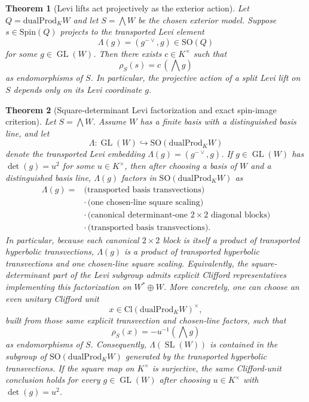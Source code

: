 \documentclass{birkjour}
\theoremstyle{plain}
\newtheorem{theorem}{Theorem}[section]
\theoremstyle{definition}
\theoremstyle{remark}
\newcommand{\Cl}{\mathrm{Cl}}
\newcommand{\Spin}{\mathrm{Spin}}
\newcommand{\SO}{\mathrm{SO}}
\newcommand{\dualProd}{\mathrm{dualProd}}
\begin{document}
\begin{theorem}[Levi lifts act projectively as the exterior action]
\label{thm:levi-projective-exterior}
Let $Q=\dualProd_K W$ and let $S=\bigwedge W$ be the chosen exterior model.
Suppose $s\in \Spin(Q)$ projects to the transported Levi element
\[
  \Lambda(g)=(g^{-{\vee}},g)\in \SO(Q)
\]
for some $g\in \operatorname{GL}(W)$. Then there exists $c\in K^\times$ such that
\[
  \rho_S(s)=c\,(\bigwedge g)
\]
as endomorphisms of $S$. In particular, the projective action of a split Levi
lift on $S$ depends only on its Levi coordinate $g$.
\end{theorem}

\begin{theorem}[Square-determinant Levi factorization and exact spin-image criterion]
\label{thm:square-det-levi}
Let $S=\bigwedge W$. Assume $W$ has a finite basis with a distinguished basis
line, and let
\[
  \Lambda:\operatorname{GL}(W)\hookrightarrow \SO(\dualProd_K W)
\]
denote the transported Levi embedding $\Lambda(g)=(g^{-{\vee}},g)$. If
$g\in \operatorname{GL}(W)$ has $\det(g)=u^2$ for some $u\in K^\times$, then
after choosing a basis of $W$ and a distinguished basis line, $\Lambda(g)$
factors in
$\SO(\dualProd_K W)$ as
\[
  \begin{aligned}
  \Lambda(g) ={}&
    \text{(transported basis transvections)} \\
    &\cdot\, \text{(one chosen-line square scaling)} \\
    &\cdot\, \text{(canonical determinant-one $2\times 2$ diagonal blocks)} \\
    &\cdot\, \text{(transported basis transvections)}.
  \end{aligned}
\]
In particular, because each canonical $2\times2$ block is itself a product of
transported hyperbolic transvections, $\Lambda(g)$ is a product of transported
hyperbolic transvections and one chosen-line square scaling. Equivalently, the
square-determinant part of the Levi subgroup admits explicit Clifford
representatives implementing this factorization on $W^*\oplus W$. More
concretely,
one can choose an even unitary Clifford unit
\[
  x\in \Cl(\dualProd_K W)^\times,
\]
built from those same explicit transvection and chosen-line factors, such that
\[
  \rho_S(x)=-u^{-1}(\bigwedge g)
\]
as endomorphisms of $S$. Consequently, $\Lambda(\operatorname{SL}(W))$ is
contained in the subgroup of
$\SO(\dualProd_K W)$ generated by the transported hyperbolic transvections.
If the square map on $K^\times$ is surjective, the same Clifford-unit conclusion
holds for every $g\in\operatorname{GL}(W)$ after choosing
$u\in K^\times$ with $\det(g)=u^2$.


\end{theorem}
\end{document}
